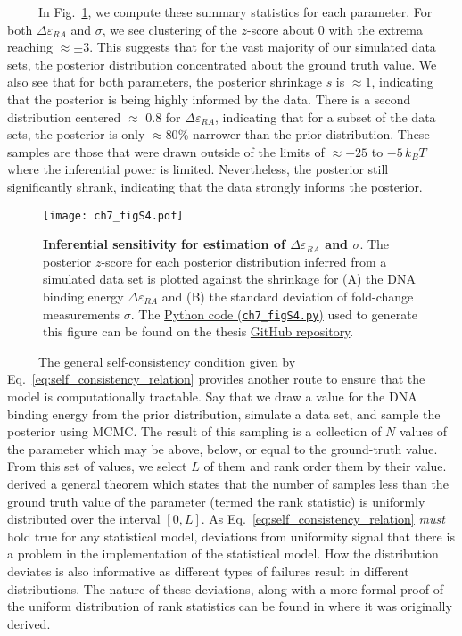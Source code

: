 \documentclass[12pt]{caltech_thesis}
\begin{document}
~~~~~In Fig.~\ref{fig:epRA_sbc_sensitivity}, we compute these summary
statistics for each parameter. For both \(\Delta\varepsilon_{RA}\) and
\(\sigma\), we see clustering of the \(z\)-score about 0 with the
extrema reaching \(\approx \pm 3\). This suggests that for the vast
majority of our simulated data sets, the posterior distribution
concentrated about the ground truth value. We also see that for both
parameters, the posterior shrinkage \(s\) is \(\approx 1\), indicating
that the posterior is being highly informed by the data. There is a
second distribution centered \(\approx\) 0.8 for
\(\Delta\varepsilon_{RA}\), indicating that for a subset of the data
sets, the posterior is only \(\approx 80\)\% narrower than the prior
distribution. These samples are those that were drawn outside of the
limits of \(\approx -25\) to \(-5\, k_BT\) where the inferential power
is limited. Nevertheless, the posterior still significantly shrank,
indicating that the data strongly informs the posterior.

\hypertarget{fig:epRA_sbc_sensitivity}{%
\begin{figure}
\centering
\texttt{[image: ch7\_figS4.pdf]}
\caption[{Inferential sensitivity for estimation of the DNA binding
energy and homoscedastic error.}]{\textbf{Inferential sensitivity for
estimation of \(\Delta\varepsilon_{RA}\) and \(\sigma\)}. The posterior
\(z\)-score for each posterior distribution inferred from a simulated
data set is plotted against the shrinkage for (A) the DNA binding energy
\(\Delta\varepsilon_{RA}\) and (B) the standard deviation of fold-change
measurements \(\sigma\). The
\href{https://github.com/gchure/phd/blob/master/src/chapter_07/code/ch7_figS4.py}{Python
code (\texttt{ch7\_figS4.py})} used to generate this figure can be found
on the thesis \href{https://github.com/gchure/phd}{GitHub repository}.}
\label{fig:epRA_sbc_sensitivity}
\end{figure}
}

~~~~~The general self-consistency condition given by
Eq.~\ref{eq:self_consistency_relation} provides another route to ensure
that the model is computationally tractable. Say that we draw a value
for the DNA binding energy from the prior distribution, simulate a data
set, and sample the posterior using MCMC. The result of this sampling is
a collection of \(N\) values of the parameter which may be above, below,
or equal to the ground-truth value. From this set of values, we select
\(L\) of them and rank order them by their value. \textcite{talts2018}
derived a general theorem which states that the number of samples less
than the ground truth value of the parameter (termed the rank statistic)
is uniformly distributed over the interval \([0, L]\). As
Eq.~\ref{eq:self_consistency_relation} \emph{must} hold true for any
statistical model, deviations from uniformity signal that there is a
problem in the implementation of the statistical model. How the
distribution deviates is also informative as different types of failures
result in different distributions. The nature of these deviations, along
with a more formal proof of the uniform distribution of rank statistics
can be found in \textcite{talts2018} where it was originally derived.
\end{document}
